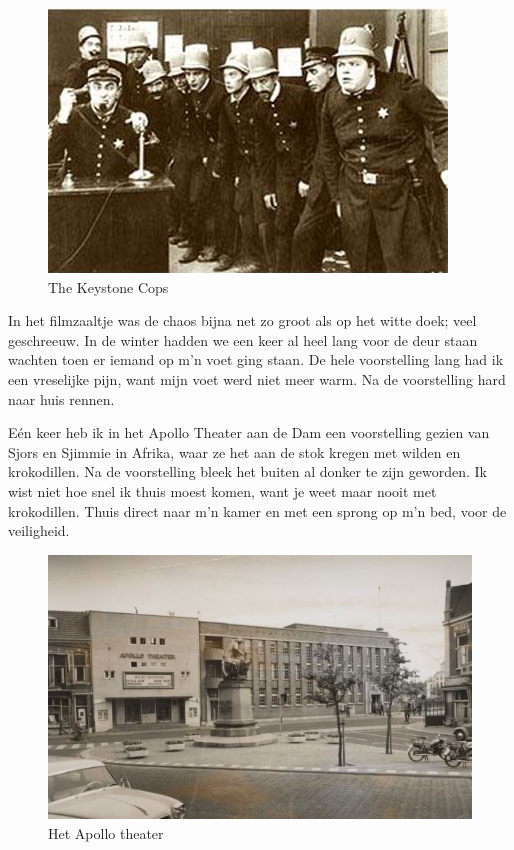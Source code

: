 \documentclass[10pt,twoside, openright]{memoir}
\begin{document}
\begin{figure}
\includegraphics[width=\textwidth]{img/ch5/ComedyCapers}
\caption*{\footnotesize The Keystone Cops}
\end{figure}

In het filmzaaltje was de chaos bijna net zo groot als op het witte doek; veel geschreeuw. In de winter hadden we een keer al heel lang voor de deur staan wachten toen er iemand op m’n voet ging staan. De hele voorstelling lang had ik een vreselijke pijn, want mijn voet werd niet meer warm. Na de voorstelling hard naar huis rennen.

Eén keer heb ik in het Apollo Theater aan de Dam een voorstelling gezien van Sjors en Sjimmie in Afrika, waar ze het aan de stok kregen met wilden en krokodillen. Na de voorstelling bleek het buiten al donker te zijn geworden. Ik wist niet hoe snel ik thuis moest komen, want je weet maar nooit met krokodillen. Thuis direct naar m’n kamer en met een sprong op m’n bed, voor de veiligheid. 

\begin{figure}
\includegraphics[width=\textwidth]{img/ch5/apollo}
\caption*{\footnotesize Het Apollo theater}
\end{figure}
\end{document}
